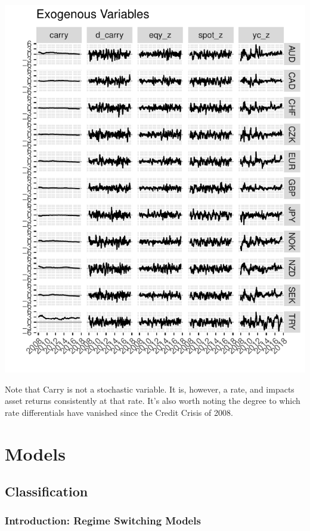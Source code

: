 \documentclass[]{article}
\begin{document}
\includegraphics{Econometric_FX_Forecasting_files/figure-latex/graph_exogs-1.pdf}

Note that Carry is not a stochastic variable. It is, however, a rate,
and impacts asset returns consistently at that rate. It's also worth
noting the degree to which rate differentials have vanished since the
Credit Crisis of 2008.

\section{Models}\label{models}

\subsection{Classification}\label{classification}

\subsubsection{Introduction: Regime Switching
Models}\label{introduction-regime-switching-models}
\end{document}
